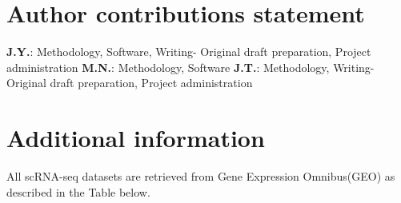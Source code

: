 \documentclass[fleqn,10pt]{wlscirep}
\begin{document}




\section*{Author contributions statement}
  \textbf{J.Y.}: Methodology, Software, Writing- Original draft preparation, Project administration
  \textbf{M.N.}: Methodology, Software
  \textbf{J.T.}: Methodology, Writing- Original draft preparation, Project administration

\section*{Additional information}
  All scRNA-seq datasets are retrieved from Gene Expression Omnibus(GEO) as described in the Table below.
\end{document}
